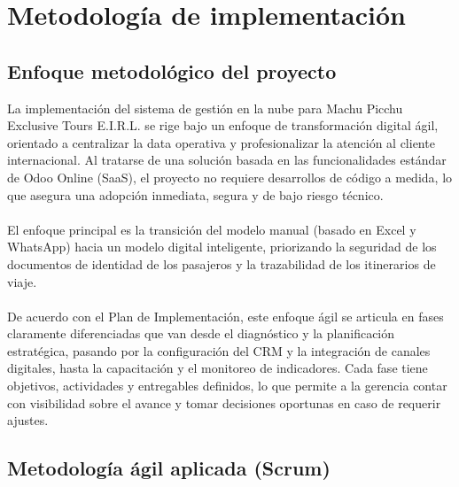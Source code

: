 \section{Metodología de implementación}

\subsection{Enfoque metodológico del proyecto}

\begin{indentedsubsection}
La implementación del sistema de gestión en la nube para Machu Picchu Exclusive Tours E.I.R.L. se rige bajo un enfoque de transformación digital ágil, orientado a centralizar la data operativa y profesionalizar la atención al cliente internacional. Al tratarse de una solución basada en las funcionalidades estándar de Odoo Online (SaaS), el proyecto no requiere desarrollos de código a medida, lo que asegura una adopción inmediata, segura y de bajo riesgo técnico.
\\
\\
El enfoque principal es la transición del modelo manual (basado en Excel y WhatsApp) hacia un modelo digital inteligente, priorizando la seguridad de los documentos de identidad de los pasajeros y la trazabilidad de los itinerarios de viaje.
\\
\\
De acuerdo con el Plan de Implementación, este enfoque ágil se articula en fases claramente diferenciadas que van desde el diagnóstico y la planificación estratégica, pasando por la configuración del CRM y la integración de canales digitales, hasta la capacitación y el monitoreo de indicadores. Cada fase tiene objetivos, actividades y entregables definidos, lo que permite a la gerencia contar con visibilidad sobre el avance y tomar decisiones oportunas en caso de requerir ajustes.

\end{indentedsubsection}

\subsection{Metodología ágil aplicada (Scrum)}


